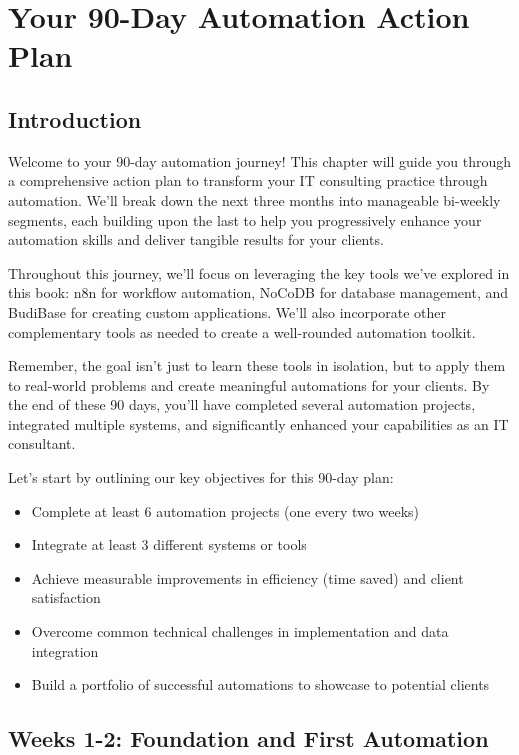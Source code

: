 \chapter{Your 90-Day Automation Action Plan}

\section{Introduction}

Welcome to your 90-day automation journey! This chapter will guide you through a comprehensive action plan to transform your IT consulting practice through automation. We'll break down the next three months into manageable bi-weekly segments, each building upon the last to help you progressively enhance your automation skills and deliver tangible results for your clients.

Throughout this journey, we'll focus on leveraging the key tools we've explored in this book: n8n for workflow automation, NoCoDB for database management, and BudiBase for creating custom applications. We'll also incorporate other complementary tools as needed to create a well-rounded automation toolkit.

Remember, the goal isn't just to learn these tools in isolation, but to apply them to real-world problems and create meaningful automations for your clients. By the end of these 90 days, you'll have completed several automation projects, integrated multiple systems, and significantly enhanced your capabilities as an IT consultant.

Let's start by outlining our key objectives for this 90-day plan:

\begin{itemize}
    \item Complete at least 6 automation projects (one every two weeks)
    \item Integrate at least 3 different systems or tools
    \item Achieve measurable improvements in efficiency (time saved) and client satisfaction
    \item Overcome common technical challenges in implementation and data integration
    \item Build a portfolio of successful automations to showcase to potential clients
\end{itemize}


\section{Weeks 1-2: Foundation and First Automation}

